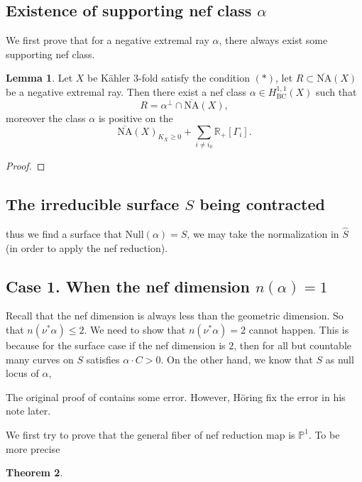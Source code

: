 \documentclass[11pt]{article}
\theoremstyle{definition}
\newtheorem{theorem}{Theorem}
\newtheorem{lemma}[theorem]{Lemma}
\begin{document}
	
	\subsection{Existence of supporting nef class $\alpha$}
	We first prove that for a negative extremal ray $\alpha$, there always exist some supporting nef class.
	
	\begin{lemma}
		Let $X$ be K\"ahler 3-fold satisfy the condition $(*)$, let $R\subset \overline{\text{NA}}(X)$ be a negative extremal ray. Then there exist a nef class $\alpha \in H^{1,1}_{\text{BC}}(X)$ such that $$R =  \alpha^\perp \cap \overline{\text{NA}}(X),$$moreover the class $\alpha$ is positive on the $$\overline{\text{NA}}(X)_{K_X \ge 0}+  \sum_{i\ne i_0}\mathbb{R}_+ [\Gamma_i].$$
	\end{lemma}
	\begin{proof}
		
	\end{proof}
	
	\subsection{The irreducible surface $S$ being contracted}
	thus we find a surface that $\text{Null}(\alpha) = S$, we may take the normalization in $\hat{S}$ (in order to apply the nef reduction).
	
	\subsection{Case 1. When the nef dimension $n(\alpha) = 1$}
	
	Recall that the nef dimension is always less than the geometric dimension. So that $n(\nu^*\alpha)\le 2$. We need to show that $n(\nu^*\alpha) =2$ cannot happen. This is because for the surface case if the nef dimension is $2$, then for all but countable many curves on $S$ satisfies $\alpha \cdot C >0$. On the other hand, we know that $S$ as null locus of $\alpha$,
	
	
	The original proof of \cite{HP16} contains some error. However, H\"oring fix the error in his note \cite{HoringDivisorial} later. 
	
	
	We first try to prove that the general fiber of nef reduction map is $\mathbb{P}^1$. To be more precise
	\begin{theorem}
		
	\end{theorem}
	
\end{document}
